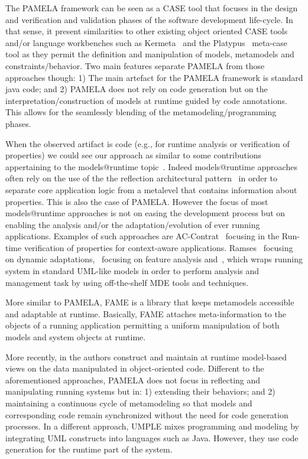 The PAMELA framework can be seen as a CASE tool that focuses in the design and verification and validation phases of the software development life-cycle. In that sense, it present similarities to other existing object oriented CASE tools and/or language workbenches such as Kermeta~\cite{kermeta} and the Platypus~\cite{platypus} meta-case tool as they permit the definition and manipulation of models, metamodels and constraints/behavior. Two main features separate PAMELA from those approaches though: 1) The main artefact for the PAMELA framework is standard java code; and 2) PAMELA does not rely on code generation but on the interpretation/construction of models at runtime guided by code annotations. This allows for the seamlessly blending of the metamodeling/programming phases.

When the observed artifact is code (e.g., for runtime analysis or verification of properties) we could see our approach as similar to some contributions appertaining to the models@runtime topic~\cite{bencomo2019models}. Indeed models@runtime approaches often rely  on the use of the the reflection architectural pattern~\cite{buschmann2008pattern} in order to separate core application logic from a metalevel that contains information about properties. This is also the case of PAMELA. However the focus of most models@runtime approaches is not on easing the development process but on enabling the analysis and/or the adaptation/evolution of ever running applications. Examples of such approaches are AC-Contrat~\cite{accontract} focusing in the Run-time verification of properties for context-aware applications. Ramses~\cite{ramses} focusing on dynamic adaptations,~\cite{denker2010modeling} focusing on feature analysis and~\cite{song2010applying}, which wraps running system in standard UML-like models in order to perform analysis and management task by using off-the-shelf MDE tools and techniques.

More similar to PAMELA, FAME \cite{kuhn2008fame} is  a library that keeps metamodels
accessible and adaptable at runtime. Basically, FAME attaches meta-information
to the objects of a running application permitting a uniform manipulation of
both models and system objects at runtime. 



More recently, in \cite{boronat2019} the authors construct and
maintain at runtime model-based views on the data manipulated in
object-oriented code. Different to the aforementioned approaches, PAMELA does
not focus in reflecting and manipulating running systems but in: 1) extending
their behaviors; and 2) maintaining a continuous cycle of metamodeling so that
models and corresponding code remain synchronized without the need for code
generation processes. In a different approach, UMPLE
\cite{lethbridge2016merging} mixes programming and modeling by integrating UML
constructs into languages such as Java. However, they use code generation for
the runtime part of the system.
